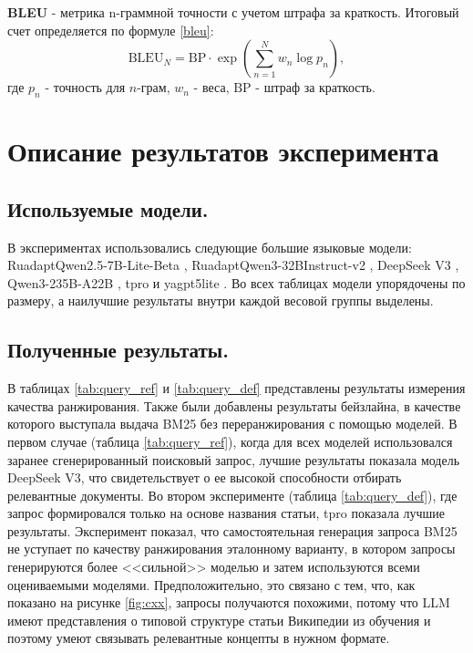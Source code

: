 \documentclass{article}
\begin{document}
\textbf{BLEU} \cite{bleu} - метрика n-граммной точности с учетом штрафа за краткость. Итоговый счет определяется по формуле \eqref{bleu}:
\begin{equation}\label{bleu}
\mathrm{BLEU}_N = \mathrm{BP}\cdot \exp\!\left(\sum_{n=1}^{N} w_n \log p_n\right),
\end{equation}
где \(p_n\) - точность для \(n\)-грам, \(w_n\) - веса, $\mathrm{BP}$ - штраф за краткость.

\section*{Описание результатов эксперимента}
\subsection*{Используемые модели.}
В экспериментах использовались следующие большие языковые модели: 
RuadaptQwen2.5-\allowbreak 7B-\allowbreak Lite-\allowbreak Beta \cite{ruadapt},
RuadaptQwen3-\allowbreak 32BInstruct-v2 \cite{ruadapt}, 
DeepSeek V3 \cite{deepseek}, 
Qwen3-\allowbreak 235B-\allowbreak A22B \cite{qwen3}, 
tpro \cite{tpro} и yagpt5lite \cite{yagpt}.
Во всех таблицах модели упорядочены по размеру, а наилучшие результаты внутри каждой весовой группы выделены.

\subsection*{Полученные результаты.}
В таблицах \ref{tab:query_ref} и \ref{tab:query_def} представлены результаты измерения качества ранжирования. 
Также были добавлены результаты бейзлайна, в качестве которого выступала выдача BM25 без переранжирования с помощью моделей. 
В первом случае (таблица \ref{tab:query_ref}), когда для всех моделей использовался заранее сгенерированный поисковый запрос, 
лучшие результаты показала модель DeepSeek V3, что свидетельствует о ее высокой способности отбирать релевантные документы.
Во втором эксперименте (таблица \ref{tab:query_def}), где запрос формировался только на основе названия статьи, tpro показала лучшие результаты. 
Эксперимент показал, что самостоятельная генерация запроса BM25 не уступает по качеству ранжирования эталонному варианту, в котором запросы генерируются более <<сильной>> моделью и затем
используются всеми оцениваемыми моделями. Предположительно, это связано с тем, что, как показано на рисунке \ref{fig:cxx}, запросы получаются похожими, потому что
LLM имеют представления о типовой структуре статьи Википедии из обучения и поэтому умеют связывать релевантные концепты в нужном формате.
\end{document}

